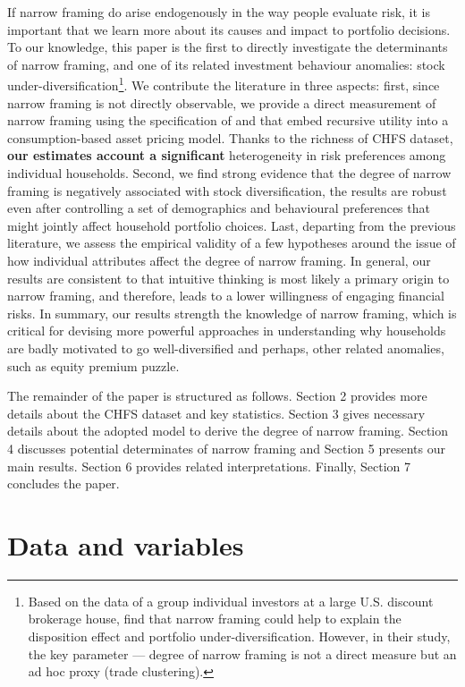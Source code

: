 \documentclass[ukenglish,nottitlepage,thmsb,11pt,letterpaper]{article}
\begin{document}
If narrow framing do arise endogenously in the way people evaluate risk, it is important that we learn more about its causes and impact to portfolio decisions. To our knowledge, this paper is the first to directly investigate the determinants of narrow framing, and one of its related investment behaviour anomalies: stock under-diversification\footnote{Based on the data of a group individual investors at a large U.S. discount brokerage house, \citet{Kumar2008} find that narrow framing could help to explain the disposition effect and portfolio under-diversification. However, in their study, the key parameter --- degree of narrow framing is not a direct measure but an ad hoc proxy (trade clustering).}. We contribute the literature in three aspects: first, since narrow framing is not directly observable, we provide a direct measurement of narrow framing using the specification of \citet{Barberis2006} and \citet{Barberis2009} that embed recursive utility into a consumption-based asset pricing model\citep{Epstein1989,Epstein1991}. Thanks to the richness of CHFS dataset,\textbf{ our estimates account a significant} heterogeneity in risk preferences among individual households. Second, we find strong evidence that the degree of narrow framing is negatively associated with stock diversification, the results are robust even after controlling a set of demographics and behavioural preferences that might jointly affect household portfolio choices. Last, departing from the previous literature, we assess the empirical validity of a few hypotheses around the issue of how individual attributes affect the degree of narrow framing. In general, our results are consistent to \citet{Kahneman2003} that intuitive thinking is most likely a primary origin to narrow framing, and therefore, leads to a lower willingness of engaging financial risks. In summary, our results strength the knowledge of narrow framing, which is critical for devising more powerful approaches in understanding why households are badly motivated to go well-diversified and perhaps, other related anomalies, such as equity premium puzzle.

The remainder of the paper is structured as follows. Section 2 provides more details about the CHFS dataset and key statistics.  Section 3 gives necessary details about the adopted model to derive the degree of narrow framing.  Section 4  discusses potential determinates of narrow framing and Section 5 presents our main results. Section 6 provides related interpretations. Finally, Section 7 concludes the paper.
\section{Data and variables}
\end{document}
